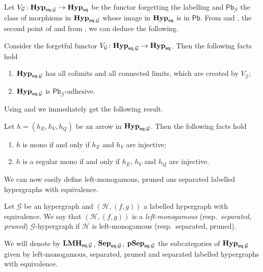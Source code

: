 \documentclass[3p]{elsarticle}
\newcommand{\pbc}{\mathsf{Pb}}
\newcommand{\eq}{\mathsf{eq}}
\newcommand{\catname}[1]{\textbf{\textup{#1}}}
\newcommand{\lmo}{\catname{LMH}}
\newcommand{\hyp}{\catname{Hyp}}
\newcommand{\pshyp}{\catname{pSep}}
\newcommand{\shyp}{\catname{Sep}}
\newcommand{\EqHyp}{\catname{Hyp}_{\mathsf{eq}}} %
\newcommand{\EqHyps}{\catname{Hyp}_{\mathsf{eq}, \mathcal{G}}}
\theoremstyle{remark}
\theoremstyle{definition}
\begin{document}
Let $V_\mathcal{G}\colon \EqHyps\to \EqHyp$ be the functor forgetting the labelling and $\pbc_\mathcal{G}$ the class of morphisms in $\EqHyps$ whose image in $\EqHyp$ is in $\pbc$. From  and , the second point of  and from , we can deduce the following.

\begin{prop}\label{prop:lim}Consider the forgetful functor $V_\mathcal{G}\colon \EqHyps\to \EqHyp$. Then the following facts hold
	\begin{enumerate}
		\item $\EqHyps$ has all colimits and all connected limits, which are created by $V_\mathcal{G}$;
		\item $\EqHyps$ is $\pbc_\mathcal{G}$-adhesive.
	\end{enumerate}
\end{prop}

Using  and  we immediately get the following result. 

\begin{cor}\label{prop:monos_in_eqhyps} Let $h=(h_{E}, h_V, h_Q)$ be an arrow in $\EqHyps$. Then the following facts hold
	\begin{enumerate}
		\item $h$ is mono if and only if $h_E$ and $h_V$ are injective;
		\item $h$ is a regular mono if and only if $h_E$, $h_V$ and $h_Q$ are injective.
	\end{enumerate}
\end{cor}


We can now easily define left-monogamous, pruned ans separated labelled hypergraphs with equivalence.

\begin{defi}Let $\mathcal{G}$ be an hypergraph and $(\mathcal{H},(f,g))$ a labelled hypergraph with equivalence.  We say that $(\mathcal{H},(f,g))$ is a \emph{left-monogamous} (resp.~\emph{separated, pruned}) $\mathcal{G}$-hypergraph if $\mathcal{H}$ is left-monogamous (resp.~separated, pruned).
	
	We will denote by $\lmo_{\eq, \mathcal{G}}$, $\shyp_{\eq, \mathcal{G}}$, $\pshyp_{\eq, \mathcal{G}}$ the subcategories of $\hyp_{\eq, \mathcal{G}}$ given by left-monogamous, separated, pruned  and separated labelled hypergraphs with equivalence.
 \end{defi}
 
\end{document}
